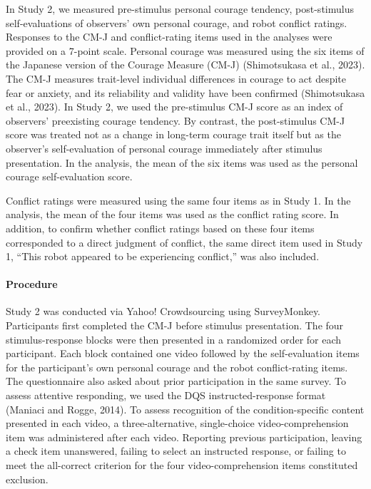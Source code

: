 In Study 2, we measured pre-stimulus personal courage tendency,
post-stimulus self-evaluations of observers' own personal courage, and
robot conflict ratings. Responses to the CM-J and conflict-rating items
used in the analyses were provided on a 7-point scale. Personal courage
was measured using the six items of the Japanese version of the Courage
Measure (CM-J) (Shimotsukasa et al., 2023). The CM-J measures
trait-level individual differences in courage to act despite fear or
anxiety, and its reliability and validity have been confirmed
(Shimotsukasa et al., 2023). In Study 2, we used the pre-stimulus CM-J
score as an index of observers' preexisting courage tendency. By
contrast, the post-stimulus CM-J score was treated not as a change in
long-term courage trait itself but as the observer's self-evaluation of
personal courage immediately after stimulus presentation. In the
analysis, the mean of the six items was used as the personal courage
self-evaluation score.

Conflict ratings were measured using the same four items as in Study 1.
In the analysis, the mean of the four items was used as the conflict
rating score. In addition, to confirm whether conflict ratings based on
these four items corresponded to a direct judgment of conflict, the same
direct item used in Study 1, ``This robot appeared to be experiencing
conflict,'' was also included.

\paragraph{Procedure}\label{procedure-1}

Study 2 was conducted via Yahoo! Crowdsourcing using SurveyMonkey.
Participants first completed the CM-J before stimulus presentation. The
four stimulus-response blocks were then presented in a randomized order
for each participant. Each block contained one video followed by the
self-evaluation items for the participant's own personal courage and the
robot conflict-rating items. The questionnaire also asked about prior
participation in the same survey. To assess attentive responding, we
used the DQS instructed-response format (Maniaci and Rogge, 2014). To
assess recognition of the condition-specific content presented in each
video, a three-alternative, single-choice video-comprehension item was
administered after each video. Reporting previous participation, leaving
a check item unanswered, failing to select an instructed response, or
failing to meet the all-correct criterion for the four
video-comprehension items constituted exclusion.

